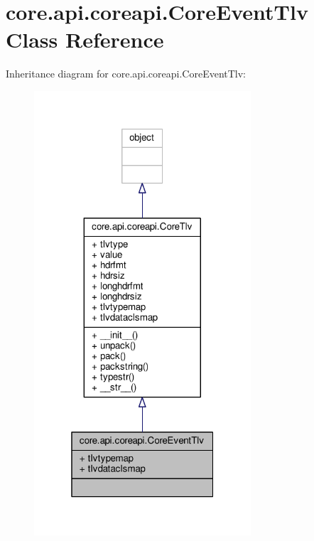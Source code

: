 \hypertarget{classcore_1_1api_1_1coreapi_1_1_core_event_tlv}{\section{core.\+api.\+coreapi.\+Core\+Event\+Tlv Class Reference}
\label{classcore_1_1api_1_1coreapi_1_1_core_event_tlv}
}


Inheritance diagram for core.\+api.\+coreapi.\+Core\+Event\+Tlv\+:
\nopagebreak
\begin{figure}[H]
\begin{center}
\leavevmode
\includegraphics[width=229pt]{classcore_1_1api_1_1coreapi_1_1_core_event_tlv__inherit__graph}
\end{center}
\end{figure}


